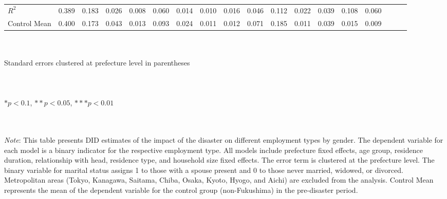 \documentclass[a4paper,12pt]{article}
\begin{document}
\begin{landscape}
\begin{table}[htbp]
{\begin{tabular}{@{}l*{17}{c}@{}}
$\textit{R}^2$&    0.389         &    0.183         &    0.026         &    0.008         &    0.060         &    0.014         &    0.010         &    0.016         &    0.046         &    0.112         &    0.022         &    0.039         &    0.108         &    0.060         \\
Control Mean&    0.400         &    0.173         &    0.043         &    0.013         &    0.093         &    0.024         &    0.011         &    0.012         &    0.071         &    0.185         &    0.011         &    0.039         &    0.015         &    0.009         \\
\bottomrule
\end{tabular}}
\raggedright
\\\\{\linewidth}{\tiny Standard errors clustered at prefecture level in parentheses}\\\\
\vspace{-0.2cm}
\\\\{\linewidth}{\tiny $*p<0.1$, $**p<0.05$, $***p<0.01$}\\\\
\\
\vspace{0.1cm}
  {\setlength{\baselineskip}{0.9\baselineskip}
  \parbox{\linewidth}{\tiny
  \textit{Note}: This table presents DID estimates of the impact of the disaster on different employment types by gender. The dependent variable for each model is a binary indicator for the respective employment type. All models include prefecture fixed effects, age group, residence duration, relationship with head, residence type, and household size fixed effects. The error term is clustered at the prefecture level. The binary variable for marital status assigns 1 to those with a spouse present and 0 to those never married, widowed, or divorced. Metropolitan areas (Tokyo, Kanagawa, Saitama, Chiba, Osaka, Kyoto, Hyogo, and Aichi) are excluded from the analysis. Control Mean represents the mean of the dependent variable for the control group (non-Fukushima) in the pre-disaster period.}}

\label{table:DID_Each_Employment_Type}

\end{table}
\end{landscape}



\end{document}
